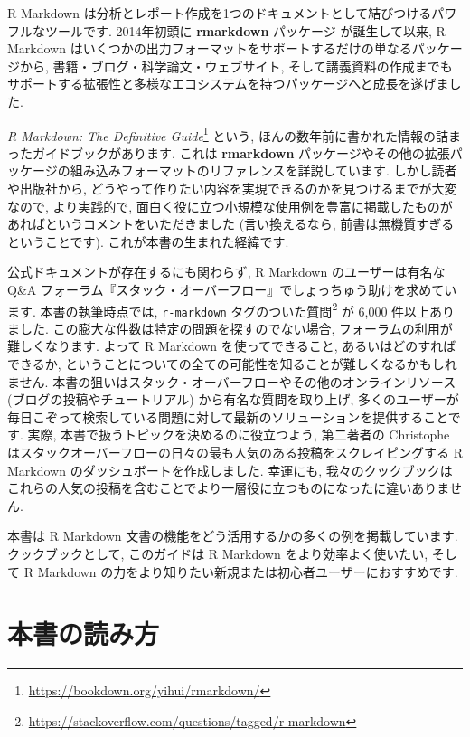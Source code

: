 \documentclass[
  11pt,
]{bxjsreport}
\renewcommand{\href}[2]{#2\footnote{\url{#1}}}
\begin{document}
R Markdown は分析とレポート作成を1つのドキュメントとして結びつけるパワフルなツールです. 2014年初頭に \textbf{rmarkdown} パッケージ \autocite{R-rmarkdown} が誕生して以来, R Markdown はいくつかの出力フォーマットをサポートするだけの単なるパッケージから, 書籍・ブログ・科学論文・ウェブサイト, そして講義資料の作成までもサポートする拡張性と多様なエコシステムを持つパッケージへと成長を遂げました.

\href{https://bookdown.org/yihui/rmarkdown/}{\emph{R Markdown: The Definitive Guide}} \autocite{rmarkdown2018} という, ほんの数年前に書かれた情報の詰まったガイドブックがあります. これは \textbf{rmarkdown} パッケージやその他の拡張パッケージの組み込みフォーマットのリファレンスを詳説しています. しかし読者や出版社から, どうやって作りたい内容を実現できるのかを見つけるまでが大変なので, より実践的で, 面白く役に立つ小規模な使用例を豊富に掲載したものがあればというコメントをいただきました (言い換えるなら, 前書は無機質すぎるということです). これが本書の生まれた経緯です.

公式ドキュメントが存在するにも関わらず, R Markdown のユーザーは有名な Q\&A フォーラム『スタック・オーバーフロー』でしょっちゅう助けを求めています. 本書の執筆時点では, \href{https://stackoverflow.com/questions/tagged/r-markdown}{\texttt{r-markdown} タグのついた質問} が 6,000 件以上ありました. この膨大な件数は特定の問題を探すのでない場合, フォーラムの利用が難しくなります. よって R Markdown を使ってできること, あるいはどのすればできるか, ということについての全ての可能性を知ることが難しくなるかもしれません. 本書の狙いはスタック・オーバーフローやその他のオンラインリソース (ブログの投稿やチュートリアル) から有名な質問を取り上げ, 多くのユーザーが毎日こぞって検索している問題に対して最新のソリューションを提供することです. 実際, 本書で扱うトピックを決めるのに役立つよう, 第二著者の Christophe はスタックオーバーフローの日々の最も人気のある投稿をスクレイピングする R Markdown のダッシュボートを作成しました. 幸運にも, 我々のクックブックはこれらの人気の投稿を含むことでより一層役に立つものになったに違いありません.

本書は R Markdown 文書の機能をどう活用するかの多くの例を掲載しています. クックブックとして, このガイドは R Markdown をより効率よく使いたい, そして R Markdown の力をより知りたい新規または初心者ユーザーにおすすめです.

\hypertarget{How-to-read-this-book}{%
\section*{本書の読み方}\label{How-to-read-this-book}}
\end{document}
